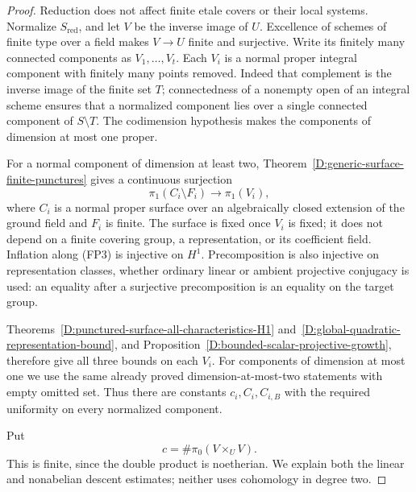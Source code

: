 \begin{proof}
Reduction does not affect finite etale covers or their local
systems.  Normalize \(S_{\mathrm{red}}\), and let \(V\) be the
inverse image of \(U\).  Excellence of schemes of finite type
over a field makes \(V\to U\) finite and surjective.  Write its
finitely many connected components as \(V_1,\ldots,V_t\).
Each \(V_i\) is a normal proper integral component with finitely
many points removed.  Indeed that complement is the inverse
image of the finite set \(T\); connectedness of a nonempty open
of an integral scheme ensures that a normalized component lies
over a single connected component of \(S\setminus T\).
The codimension hypothesis makes the components of dimension
at most one proper.

For a normal component of dimension at least two,
Theorem~\ref{D:generic-surface-finite-punctures} gives a continuous surjection
\[
 \pi_1(C_i\setminus F_i)\longrightarrow\pi_1(V_i),
 \tag{FP3}
\]
where \(C_i\) is a normal proper surface over an algebraically
closed extension of the ground field and \(F_i\) is finite.
The surface is fixed once \(V_i\) is fixed; it does not depend
on a finite covering group, a representation, or its coefficient
field.  Inflation along (FP3) is injective on \(H^1\).
Precomposition is also injective on representation classes,
whether ordinary linear or ambient projective conjugacy is
used: an equality after a surjective precomposition is an
equality on the target group.

Theorems~\ref{D:punctured-surface-all-characteristics-H1}
and~\ref{D:global-quadratic-representation-bound}, and
Proposition~\ref{D:bounded-scalar-projective-growth}, therefore
give all three bounds on each \(V_i\).  For components of
dimension at most one we use the same already proved
dimension-at-most-two statements with empty omitted set.
Thus there are constants \(c_i,C_i,C_{i,B}\) with the required
uniformity on every normalized component.

Put
\[
                   c=\#\pi_0(V\times_U V).
\]
This is finite, since the double product is noetherian.
We explain both the linear and nonabelian descent estimates;
neither uses cohomology in degree two.


\end{proof}
